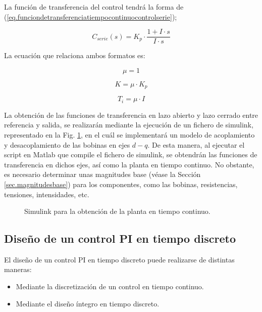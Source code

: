 \documentclass{report}
\begin{document}
La función de transferencia del control tendrá la forma de (\ref{eq.funciondetransferenciatiempocontinuocontrolserie});

\begin{equation}
    C_{serie}(s) = K_p \cdot  \frac{1+I\cdot s}{I\cdot s} \label{eq.funciondetransferenciatiempocontinuocontrolserie}
\end{equation}

La ecuación que relaciona ambos formatos es:

\begin{equation*}\label{eq.paraleloaserie}
    \mu = 1
\end{equation*}

\begin{equation*}
K = \mu \cdot  K_{p} 
\end{equation*}

\begin{equation*}
T_{i} = \mu \cdot  I
\end{equation*}

La obtención de las funciones de transferencia en lazo abierto y lazo cerrado entre referencia y salida, se realizarán mediante la ejecución de un fichero de simulink, representado en la Fig. \ref{fig.Ldqp_simulink}, en el cuál se implementará un modelo de acoplamiento y desacoplamiento de las bobinas en ejes $d-q$.  De esta manera, al ejecutar el script en Matlab que compile el fichero de simulink, se obtendrán las funciones de transferencia en dichos ejes, así como la planta en tiempo continuo. No obstante, es necesario determinar unas magnitudes base (véase la Sección \ref{sec.magnitudesbase}) para los componentes, como las bobinas, resistencias, tensiones, intensidades, etc. 

\begin{figure}[!h]
    \centering
    \caption{Simulink para la obtención de la planta en tiempo continuo.}
    \label{fig.Ldqp_simulink}
\end{figure} 

\clearpage

\subsection{Diseño de un control PI en tiempo discreto} \label{sec.controlPIDtiempodiscretp}

El diseño de un control PI en tiempo discreto puede realizarse de distintas maneras:
\begin{itemize}
    \item Mediante la discretización de un control en tiempo continuo.
    \item Mediante el diseño íntegro en tiempo discreto.
\end{itemize}
\end{document}
